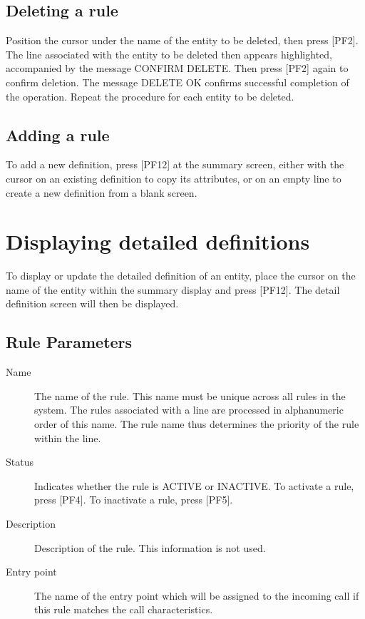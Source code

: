 \documentclass[letterpaper,10pt,english]{sphinxmanual}
\begin{document}
\subsection{Deleting a rule}
\label{\detokenize{connectivity_guide:deleting-a-rule}}
Position the cursor under the name of the entity to be deleted, then press {[}PF2{]}. The line associated with the entity to be deleted then appears highlighted, accompanied by the message CONFIRM DELETE. Then press {[}PF2{]} again to confirm deletion. The message DELETE OK confirms successful completion of the operation. Repeat the procedure for each entity to be deleted.


\subsection{Adding a rule}
\label{\detokenize{connectivity_guide:adding-a-rule}}
To add a new definition, press {[}PF12{]} at the summary screen, either with the cursor on an existing definition to copy its attributes, or on an empty line to create a new definition from a blank screen.


\section{Displaying detailed definitions}
\label{\detokenize{connectivity_guide:displaying-detailed-definitions}}
To display or update the detailed definition of an entity, place the cursor on the name of the entity within the summary display and press {[}PF12{]}. The detail definition screen will then be displayed.



\subsection{Rule Parameters}
\label{\detokenize{connectivity_guide:rule-parameters}}\begin{description}
\item[{Name}] \leavevmode
The name of the rule. This name must be unique across all rules in the system. The rules associated with a line are processed in alphanumeric order of this name. The rule name thus determines the priority of the rule within the line.

\item[{Status}] \leavevmode
Indicates whether the rule is ACTIVE or INACTIVE. To activate a rule, press {[}PF4{]}. To inactivate a rule, press {[}PF5{]}.

\item[{Description}] \leavevmode
Description of the rule. This information is not used.

\item[{Entry point}] \leavevmode
The name of the entry point which will be assigned to the incoming call if this rule matches the call characteristics.

\end{description}
\end{document}
